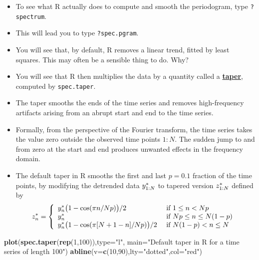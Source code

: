 \documentclass[]{article}
\newenvironment{Shaded}{\begin{snugshade}}{\end{snugshade}}
\newcommand{\KeywordTok}[1]{\textcolor[rgb]{0.13,0.29,0.53}{\textbf{#1}}}
\newcommand{\DataTypeTok}[1]{\textcolor[rgb]{0.13,0.29,0.53}{#1}}
\newcommand{\DecValTok}[1]{\textcolor[rgb]{0.00,0.00,0.81}{#1}}
\newcommand{\StringTok}[1]{\textcolor[rgb]{0.31,0.60,0.02}{#1}}
\newcommand{\NormalTok}[1]{#1}
\begin{document}
\begin{itemize}
\item
  To see what R actually does to compute and smooth the periodogram,
  type \texttt{?spectrum}.
\item
  This will lead you to type \texttt{?spec.pgram}.
\item
  You will see that, by default, R removes a linear trend, fitted by
  least squares. This may often be a sensible thing to do. Why?
\item
  You will see that R then multiplies the data by a quantity called a
  \href{https://en.wikipedia.org/wiki/Window_function}{\textbf{taper}},
  computed by \texttt{spec.taper}.
\item
  The taper smooths the ends of the time series and removes
  high-frequency artifacts arising from an abrupt start and end to the
  time series.
\item
  Formally, from the perspective of the Fourier transform, the time
  series takes the value zero outside the observed time points \(1:N\).
  The sudden jump to and from zero at the start and end produces
  unwanted effects in the frequency domain.
\item
  The default taper in R smooths the first and last \(p=0.1\) fraction
  of the time points, by modifying the detrended data \(y_{1:N}^*\)
  to tapered version \(z_{1:N}^*\) defined by
  \[ z_n^* = \left\{
  \begin{array}{ll}
  y_n^* \big(1-\cos(\pi n/Np)\big)/2 & \mbox{ if $1\le n< Np$ }
  \\
  y_n^*  & \mbox{ if $Np \le n \le N(1-p)$ }
  \\
  y_n^* \big(1-\cos(\pi [N+1-n]/Np)\big)/2 & \mbox{ if $N(1-p)<n\le N$ }
  \end{array}\right.
  \]
\end{itemize}

\begin{Shaded}
\begin{Highlighting}[]
\KeywordTok{plot}\NormalTok{(}\KeywordTok{spec.taper}\NormalTok{(}\KeywordTok{rep}\NormalTok{(}\DecValTok{1}\NormalTok{,}\DecValTok{100}\NormalTok{)),}\DataTypeTok{type=}\StringTok{"l"}\NormalTok{,}
  \DataTypeTok{main=}\StringTok{"Default taper in R for a time series of length 100"}\NormalTok{)}
\KeywordTok{abline}\NormalTok{(}\DataTypeTok{v=}\KeywordTok{c}\NormalTok{(}\DecValTok{10}\NormalTok{,}\DecValTok{90}\NormalTok{),}\DataTypeTok{lty=}\StringTok{"dotted"}\NormalTok{,}\DataTypeTok{col=}\StringTok{"red"}\NormalTok{)}
\end{Highlighting}
\end{Shaded}
\end{document}
